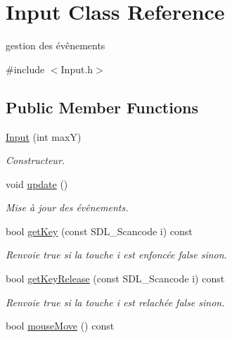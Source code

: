 \hypertarget{classInput}{\section{Input Class Reference}
\label{classInput}
}


gestion des évênements  




{\ttfamily \#include $<$Input.\+h$>$}

\subsection*{Public Member Functions}
\begin{DoxyCompactItemize}
\item 
\hyperlink{classInput_a91b4b0b006c42d9f334e4fa7f56609e1}{Input} (int max\+Y)
\begin{DoxyCompactList}\small\item\em Constructeur. \end{DoxyCompactList}\item 
\hypertarget{classInput_aa7fe26710dd863d11737bf2f6de4ad05}{void \hyperlink{classInput_aa7fe26710dd863d11737bf2f6de4ad05}{update} ()}\label{classInput_aa7fe26710dd863d11737bf2f6de4ad05}

\begin{DoxyCompactList}\small\item\em Mise à jour des évênements. \end{DoxyCompactList}\item 
\hypertarget{classInput_adafc672c3b01194f8adfc120da0d00fe}{bool \hyperlink{classInput_adafc672c3b01194f8adfc120da0d00fe}{get\+Key} (const S\+D\+L\+\_\+\+Scancode i) const }\label{classInput_adafc672c3b01194f8adfc120da0d00fe}

\begin{DoxyCompactList}\small\item\em Renvoie true si la touche i est enfoncée false sinon. \end{DoxyCompactList}\item 
\hypertarget{classInput_a23a27890996e4b7af907098d9cb896d7}{bool \hyperlink{classInput_a23a27890996e4b7af907098d9cb896d7}{get\+Key\+Release} (const S\+D\+L\+\_\+\+Scancode i) const }\label{classInput_a23a27890996e4b7af907098d9cb896d7}

\begin{DoxyCompactList}\small\item\em Renvoie true si la touche i est relachée false sinon. \end{DoxyCompactList}\item 
\hypertarget{classInput_af6198fd243064d36ab465baa06b039e1}{bool \hyperlink{classInput_af6198fd243064d36ab465baa06b039e1}{mouse\+Move} () const }\label{classInput_af6198fd243064d36ab465baa06b039e1}


\end{DoxyCompactItemize}
